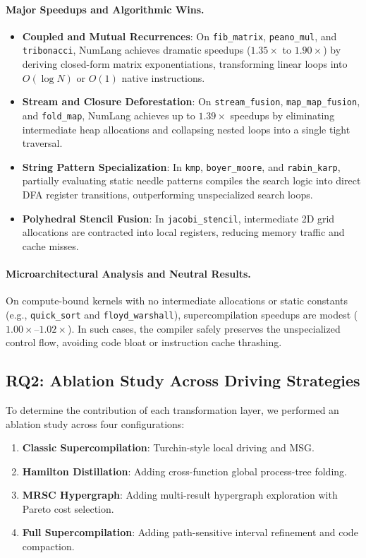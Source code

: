 \paragraph{Major Speedups and Algorithmic Wins.}
\begin{itemize}
    \item \textbf{Coupled and Mutual Recurrences}: On \texttt{fib\_matrix}, \texttt{peano\_mul}, and \texttt{tribonacci}, NumLang achieves dramatic speedups ($1.35\times$ to $1.90\times$) by deriving closed-form matrix exponentiations, transforming linear loops into $O(\log N)$ or $O(1)$ native instructions.
    \item \textbf{Stream and Closure Deforestation}: On \texttt{stream\_fusion}, \texttt{map\_map\_fusion}, and \texttt{fold\_map}, NumLang achieves up to $1.39\times$ speedups by eliminating intermediate heap allocations and collapsing nested loops into a single tight traversal.
    \item \textbf{String Pattern Specialization}: In \texttt{kmp}, \texttt{boyer\_moore}, and \texttt{rabin\_karp}, partially evaluating static needle patterns compiles the search logic into direct DFA register transitions, outperforming unspecialized search loops.
    \item \textbf{Polyhedral Stencil Fusion}: In \texttt{jacobi\_stencil}, intermediate 2D grid allocations are contracted into local registers, reducing memory traffic and cache misses.
\end{itemize}

\paragraph{Microarchitectural Analysis and Neutral Results.}
On compute-bound kernels with no intermediate allocations or static constants (e.g., \texttt{quick\_sort} and \texttt{floyd\_warshall}), supercompilation speedups are modest ($1.00\times$--$1.02\times$). In such cases, the compiler safely preserves the unspecialized control flow, avoiding code bloat or instruction cache thrashing.

\subsection{RQ2: Ablation Study Across Driving Strategies}
To determine the contribution of each transformation layer, we performed an ablation study across four configurations:
\begin{enumerate}
    \item \textbf{Classic Supercompilation}: Turchin-style local driving and MSG.
    \item \textbf{Hamilton Distillation}: Adding cross-function global process-tree folding.
    \item \textbf{MRSC Hypergraph}: Adding multi-result hypergraph exploration with Pareto cost selection.
    \item \textbf{Full Supercompilation}: Adding path-sensitive interval refinement and code compaction.
\end{enumerate}

